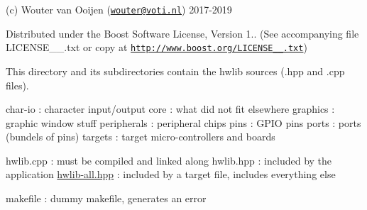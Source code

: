 (c) Wouter van Ooijen (\href{mailto:wouter@voti.nl}{\tt wouter@voti.\+nl}) 2017-\/2019

Distributed under the Boost Software License, Version 1.. (See accompanying file L\+I\+C\+E\+N\+S\+E\+\_\+\_.\+txt or copy at \href{http://www.boost.org/LICENSE_1_0.txt}{\tt http\+://www.\+boost.\+org/\+L\+I\+C\+E\+N\+S\+E\+\_\+\_.\+txt})

This directory and its subdirectories contain the hwlib sources (.hpp and .cpp files).

char-\/io \+: character input/output core \+: what did not fit elsewhere graphics \+: graphic window stuff peripherals \+: peripheral chips pins \+: G\+P\+IO pins ports \+: ports (bundels of pins) targets \+: target micro-\/controllers and boards

hwlib.\+cpp \+: must be compiled and linked along hwlib.\+hpp \+: included by the application \hyperlink{hwlib-all_8hpp_source}{hwlib-\/all.\+hpp} \+: included by a target file, includes everything else

makefile \+: dummy makefile, generates an error 